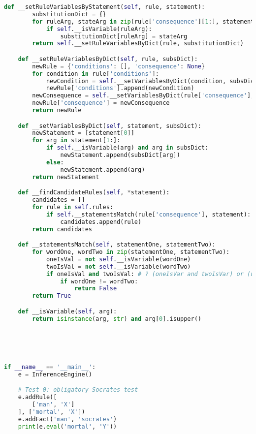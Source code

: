\begin{lstlisting}[language=python]
    def __setRuleVariablesByStatement(self, rule, statement):
        substitutionDict = {}
        for ruleArg, stateArg in zip(rule['consequence'][1:], statement[1:]):
            if self.__isVariable(ruleArg):
                substitutionDict[ruleArg] = stateArg
        return self.__setRuleVariablesByDict(rule, substitutionDict)

    def __setRuleVariablesByDict(self, rule, subsDict):
        newRule = {'conditions': [], 'consequence': None}
        for condition in rule['conditions']:
            newCondition = self.__setVariablesByDict(condition, subsDict)
            newRule['conditions'].append(newCondition)
        newConsequence = self.__setVariablesByDict(rule['consequence'], subsDict)
        newRule['consequence'] = newConsequence
        return newRule

    def __setVariablesByDict(self, statement, subsDict):
        newStatement = [statement[0]]
        for arg in statement[1:]:
            if self.__isVariable(arg) and arg in subsDict:
                newStatement.append(subsDict[arg])
            else:
                newStatement.append(arg)
        return newStatement

    def __findCandidateRules(self, *statement):
        candidates = []
        for rule in self.rules:
            if self.__statementsMatch(rule['consequence'], statement):
                candidates.append(rule)
        return candidates

    def __statementsMatch(self, statementOne, statementTwo):
        for wordOne, wordTwo in zip(statementOne, statementTwo):
            oneIsVal = not self.__isVariable(wordOne)
            twoIsVal = not self.__isVariable(wordTwo)
            if oneIsVal and twoIsVal: # ? (oneIsVar and twoIsVar) or (not oneIsVar and not twoIsVar):
                if wordOne != wordTwo:
                    return False
        return True

    def __isVariable(self, arg):
        return isinstance(arg, str) and arg[0].isupper()





if __name__ == '__main__':
    e = InferenceEngine() 

    # Test 0: obligatory Socrates test
    e.addRule([
        ['man', 'X']
    ], ['mortal', 'X'])
    e.addFact('man', 'socrates')
    print(e.eval('mortal', 'Y'))
\end{lstlisting}